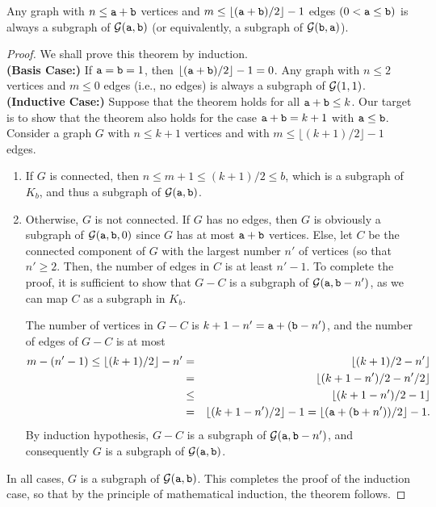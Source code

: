 \begin{theorem}
Any graph with $n \leq \mathtt{a} + \mathtt{b}$ vertices and $m \leq \lfloor (\mathtt{a}+\mathtt{b})/2 \rfloor-1$ edges $(0<\mathtt{a} \leq \mathtt{b})$ 
is always a subgraph of ${\cal G}(\mathtt{a},\mathtt{b})$ (or equivalently, a subgraph of ${\cal G}(\mathtt{b},\mathtt{a})$).
\end{theorem}

\begin{proof}
We shall prove this theorem by induction.  \\

\noindent
{\bf (Basis Case:)} If $\mathtt{a} = \mathtt{b} =1$, then $\lfloor (\mathtt{a}+\mathtt{b})/2 \rfloor-1 = 0$. Any graph with $n \leq 2$ vertices and $m \leq 0$ edges (i.e., no edges) is always a subgraph of ${\cal G}(1,1)$.
\\

\noindent
{\bf (Inductive Case:)} Suppose that the theorem holds for all $\mathtt{a} + \mathtt{b} \leq k$.  Our target is to show that the theorem also holds for the case $\mathtt{a} + \mathtt{b} = k + 1$ with $\mathtt{a} \leq \mathtt{b}$.   Consider a graph $G$ with  $n \leq k+1$ vertices and with $m \leq \lfloor (k+1)/2 \rfloor -1$ edges. 

\begin{enumerate}
  \item If $G$ is connected, then $n \leq m + 1 \leq (k+1)/2 \leq b$, which is a subgraph of $K_b$, 
           and thus a subgraph of ${\cal G}(\mathtt{a},\mathtt{b})$.   

  \item Otherwise, $G$ is not connected.  If $G$ has no edges, then $G$ is obviously a subgraph of ${\cal G}(\mathtt{a},\mathtt{b},0)$ 
          since $G$ has at most $\mathtt{a}+\mathtt{b}$ vertices.
          Else, let $C$ be the connected component of $G$ with the largest number $n'$ of vertices (so that $n' \geq 2$.
          Then, the number of edges in $C$ is at least $n'-1$.  To complete the proof, it is sufficient to show 
          that $G - C$ is a subgraph of ${\cal G}(\mathtt{a}, \mathtt{b} - n')$, as we can map $C$ as a subgraph in $K_b$.

The number of vertices in $G-C$ is $k+1-n' = \mathtt{a} + (\mathtt{b}-n')$, and the number of edges of $G-C$ is at most 
\begin{eqnarray*}
m - (n'-1) \leq \lfloor(k+1)/2\rfloor - n' &=& \lfloor(k+1)/2 - n'\rfloor \\
&=& \lfloor (k+1-n')/2 - n'/2 \rfloor \\
&\leq& \lfloor (k+1-n')/2 - 1 \rfloor \\
&=& \lfloor(k+1-n')/2\rfloor - 1 = \lfloor (\mathtt{a} + (\mathtt{b}+n'))/2 \rfloor - 1.
\end{eqnarray*}
By induction hypothesis, $G-C$ is a subgraph of ${\cal G}(\mathtt{a}, \mathtt{b}-n')$, 
and consequently $G$ is a subgraph of ${\cal G}(\mathtt{a},\mathtt{b})$.
\end{enumerate}
In all cases, $G$ is a subgraph of ${\cal G}(\mathtt{a},\mathtt{b})$.  This completes the proof of the induction case, so that by the principle of mathematical induction, the theorem follows.
\end{proof}

